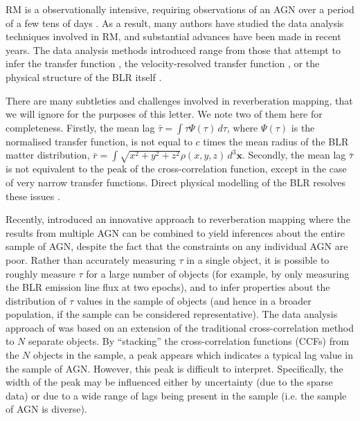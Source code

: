\documentclass[useAMS,usenatbib]{mn2e}
\begin{document}
RM is a observationally intensive, requiring observations of an AGN
over a period of
a few tens of days \citep{2013ApJ...769..128B}. As a result, many authors have
studied the data analysis techniques involved in RM, and substantial
advances have been made in recent years.
The data analysis methods introduced range from those that attempt to infer the
transfer function \citep[the distribution of lags in a single object,
e.g.][]{1995ApJ...440..166K, 2011ApJ...735...80Z},
the velocity-resolved transfer function
\citep{2010ApJ...720L..46B}, or the physical structure of the BLR itself
\citep{pancoast, arp151, pancoast2, 2013arXiv1310.3907L}.

There are many subtleties and challenges involved in reverberation mapping,
that we will ignore
for the purposes of this letter. We note two of them here for completeness. Firstly,
the mean lag $\bar{\tau} = \int \tau\Psi(\tau)\, d\tau$, where $\Psi(\tau)$
is the normalised transfer function, is not equal to $c$ times the mean radius of the BLR
matter distribution, $\bar{r} = \int \sqrt{x^2+y^2+z^2}\rho(x, y, z)\, d^3 \mathbf{x}$.
Secondly, the mean lag $\bar{\tau}$ is not equivalent to the peak of the
cross-correlation function, except in the case of very narrow
transfer functions. Direct physical modelling of the BLR resolves these
issues \citep{pancoast, arp151, 2013arXiv1310.3907L}.

Recently, \citet{2012MNRAS.427.2701F, 2013MNRAS.434L..16F} introduced an
innovative approach to reverberation mapping where the results from multiple
AGN can be combined to yield inferences about the entire sample of AGN,
despite the fact that the constraints on any individual AGN are poor. Rather
than accurately measuring $\tau$ in a single object, it is possible to roughly
measure $\tau$ for a large number of objects (for example, by only measuring
the BLR emission line flux at two epochs), and to infer properties about
the distribution of $\tau$ values in the sample of objects (and hence in
a broader population, if the sample can be considered representative).
The data analysis approach of \citet{2012MNRAS.427.2701F} was based on an
extension of the traditional cross-correlation method to $N$ separate objects.
By ``stacking'' the cross-correlation functions (CCFs) from the $N$ objects in
the sample, a peak appears which indicates a typical lag value in the sample
of AGN. However, this peak is difficult to interpret. Specifically, the width
of the peak may be influenced either by uncertainty (due to the sparse data)
or due to a wide range of lags being present in the sample (i.e. the sample of
AGN is diverse).
\end{document}
